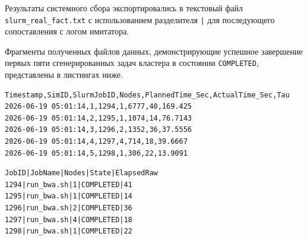 Результаты системного сбора экспортировались в текстовый файл \texttt{slurm\_real\_fact.txt} с использованием разделителя \texttt{|} для последующего сопоставления с логом имитатора.

Фрагменты полученных файлов данных, демонстрирующие успешное завершение первых пяти сгенерированных задач кластера в состоянии \texttt{COMPLETED}, представлены в листингах ниже.

\begin{lstlisting}[caption={Фрагмент файла статистики имитатора simulation\_stats.csv}]
Timestamp,SimID,SlurmJobID,Nodes,PlannedTime_Sec,ActualTime_Sec,Tau
2026-06-19 05:01:14,1,1294,1,6777,40,169.425
2026-06-19 05:01:14,2,1295,1,1074,14,76.7143
2026-06-19 05:01:14,3,1296,2,1352,36,37.5556
2026-06-19 05:01:14,4,1297,4,714,18,39.6667
2026-06-19 05:01:14,5,1298,1,306,22,13.9091
\end{lstlisting}

\begin{lstlisting}[caption={Фрагмент системного лога планировщика slurm\_real\_fact.txt}]
JobID|JobName|Nodes|State|ElapsedRaw
1294|run_bwa.sh|1|COMPLETED|41
1295|run_bwa.sh|1|COMPLETED|14
1296|run_bwa.sh|2|COMPLETED|36
1297|run_bwa.sh|4|COMPLETED|18
1298|run_bwa.sh|1|COMPLETED|22
\end{lstlisting}